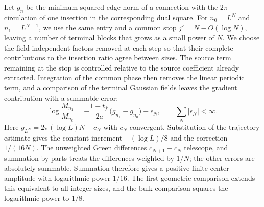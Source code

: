 Let \(g_n\) be the minimum squared edge norm of a connection with the
\(2\pi\) circulation of one insertion in the corresponding dual square.
For \(n_0=L^N\) and \(n_1=L^{N+1}\), we use the same entry and a common
stop \(j'=N-O(\log N)\), leaving a number of terminal blocks that grows
as a small power of \(N\).  We choose the field-independent factors removed
at each step so that their complete contributions to the insertion ratio
agree between sizes.  The source term remaining at the stop is controlled
relative to the source coefficient already extracted.  Integration of the
common phase then removes the linear periodic term, and a comparison of the
terminal Gaussian fields leaves the gradient contribution with a summable
error:
\[
 \log\frac{M_{n_1}}{M_{n_0}}
 =-\frac{1-t_{j'}}{2a}\bigl(g_{n_1}-g_{n_0}\bigr)+\epsilon_N,
 \qquad \sum_N|\epsilon_N|<\infty.
\]
Here \(g_{L^N}=2\pi(\log L)N+c_N\) with \(c_N\) convergent.  Substitution
of the trajectory estimate gives the constant increment \(-(\log L)/8\)
and the correction \(1/(16N)\).  The unweighted Green differences
\(c_{N+1}-c_N\) telescope, and summation by parts treats the differences
weighted by \(1/N\); the other errors are absolutely summable.  Summation
therefore gives a positive finite center amplitude with logarithmic power
\(1/16\).  The first geometric comparison extends this equivalent to all
integer sizes, and the bulk comparison squares the logarithmic power to
\(1/8\).
